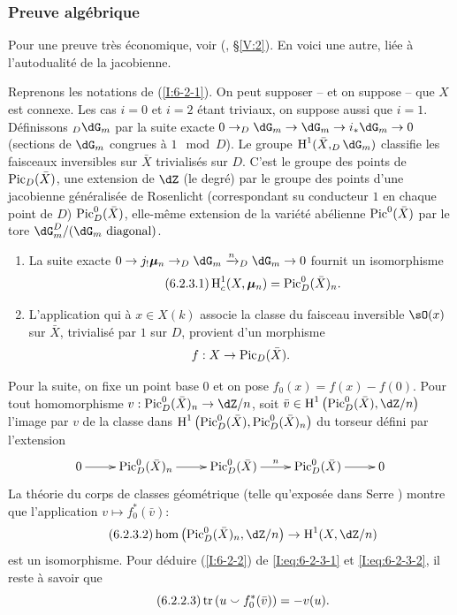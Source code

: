 \subsubsection{Preuve algébrique}\label{I:6-2-3}

Pour une preuve très économique, voir (, \S\ref{V:2}). 
En voici une autre, liée à l'autodualité de la jacobienne. 

Reprenons les notations de (\ref{I:6-2-1}). On peut supposer -- et on suppose -- 
que $X$ est connexe. Les cas $i=0$ et $i=2$ étant triviaux, on suppose aussi 
que $i=1$. Définissons $_D\dG_m$ par la suite exacte 
$0\to _D\dG_m \to \dG_m \to i_*\dG_m\to 0$ (sections de $\dG_m$ congrues à 
$1\mod D$). Le groupe $\h^1(\bar X, _D\dG_m)$ classifie les faisceaux 
inversibles sur $\bar X$ trivialisés sur $D$. C'est le groupe des points de 
$\operatorname{Pic}_D(\bar X)$, une extension de $\dZ$ (le degré) par le groupe des points 
d'une jacobienne généralisée de Rosenlicht (correspondant su conducteur 
$1$ en chaque point de $D$) $\operatorname{Pic}_D^0(\bar X)$, elle-même extension de la 
variété abélienne $\operatorname{Pic}^0(\bar X)$ par le tore 
$\dG_m^D/(\text{$\dG_m$ diagonal})$. 

\begin{enumerate}[\indent a)]
  \item La suite exacte 
    $0\to j_!\dmu_n \to _D\dG_m \xrightarrow{n} _D\dG_m\to 0$ fournit un 
    isomorphisme 
    \begin{equation*}\tag{6.2.3.1}\label{I:eq:6-2-3-1}
      \operatorname{H}_c^1(X,{\bm\mu}_n) = \operatorname{Pic}_D^0(\bar X)_n \text{.}
    \end{equation*}
  \item L'application qui à $x\in X(k)$ associe la classe du faisceau 
    inversible $\sO(x)$ sur $\bar X$, trivialisé par $1$ sur $D$, provient 
    d'un morphisme 
    \[
      f:X \to \operatorname{Pic}_D(\bar X) \text{.}
    \]
\end{enumerate}
Pour la suite, on fixe un point base $0$ et on pose $f_0(x)=f(x)-f(0)$. Pour 
tout homomorphisme $v:\pic_D^0(\bar X)_n \to \dZ/n$, soit 
$\bar v\in \h^1\left(\pic_D^0(\bar X),\dZ/n\right)$ l'image par $v$ de la classe 
dans $\operatorname{H}^1\left(\operatorname{Pic}_D^0(\bar X),\operatorname{Pic}_D^0(\bar X)_n\right)$ du torseur défini 
par l'extension 
\[\xymatrix{
  0 \ar[r] 
    & \pic_D^0(\bar X)_n \ar[r] 
    & \pic_D^0(\bar X) \ar[r]^-n 
    & \pic_D^0(\bar X) \ar[r] 
    & 0
}\]
La théorie du corps de classes géométrique (telle qu'exposée dans 
Serre \cite{se59}) montre que l'application $v\mapsto f_0^*(\bar v)$: 
\begin{equation*}\tag{6.2.3.2}\label{I:eq:6-2-3-2}
  \hom\left(\pic_D^0(\bar X)_n,\dZ/n\right) \to \h^1(X,\dZ/n)
\end{equation*}
est un isomorphisme. Pour déduire (\ref{I:6-2-2}) de \eqref{I:eq:6-2-3-1} et 
\eqref{I:eq:6-2-3-2}, il reste à savoir que 
\begin{equation*}\tag{6.2.2.3}\label{I:eq:6-2-3-3}
  \operatorname{tr}\left(u \smallsmile f_0^*(\bar v)\right) = -v(u) \text{.}
\end{equation*}

